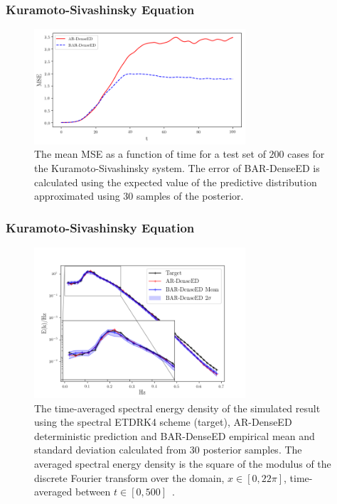 \documentclass{beamer}
\theoremstyle{remark}
\begin{document}
\begin{frame}
\frametitle{Kuramoto-Sivashinsky Equation}
\begin{figure}[H]
    \centering
    \includegraphics[width=0.7\textwidth]{Fig06.png}
    \caption{The mean MSE as a function of time for a test set of $200$ cases for the Kuramoto-Sivashinsky system.
    The error of BAR-DenseED is calculated using the expected value of the predictive distribution approximated using 30 samples of the posterior.}
    \label{fig:ks-mse}
\end{figure}
\end{frame}

\begin{frame}
\frametitle{Kuramoto-Sivashinsky Equation}

\begin{figure}[H]
    \centering
    \includegraphics[width=0.7\textwidth]{Fig07.png}
    \caption{The time-averaged spectral energy density of the simulated result using the spectral ETDRK4 scheme (target), AR-DenseED deterministic prediction and BAR-DenseED empirical mean and standard deviation calculated from $30$ posterior samples.
    The averaged spectral energy density is the square of the modulus of the discrete Fourier transform over the domain, $x\in[0,22\pi]$, time-averaged between $t\in[0,500]$~\cite{brummitt2009search}.}
    \label{fig:ks-esd}
\end{figure}
\end{frame}
\end{document}
